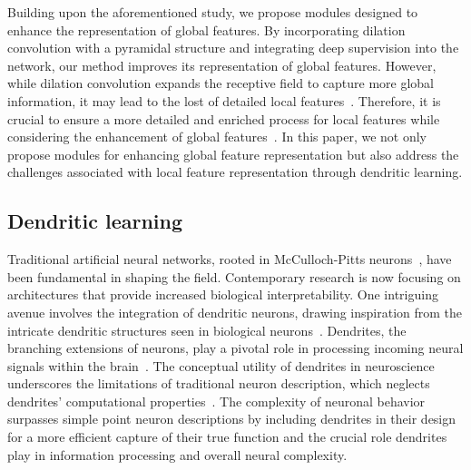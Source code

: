 \documentclass[review]{elsarticle}
\begin{document}
	Building upon the aforementioned study, we propose modules designed to enhance the representation of global features. By incorporating dilation convolution with a pyramidal structure and integrating deep supervision into the network, our method improves its representation of global features. However, while dilation convolution expands the receptive field to capture more global information, it may lead to the lost of detailed local features~\cite{hamaguchi2018effective}. Therefore, it is crucial to ensure a more detailed and enriched process for local features while considering the enhancement of global features~\cite{liu2020color}. In this paper, we not only propose modules for enhancing global feature representation but also address the challenges associated with local feature representation through dendritic learning.

	\subsection{Dendritic learning}		
	Traditional artificial neural networks, rooted in McCulloch-Pitts neurons~\cite{mcculloch1943logical}, have been fundamental in shaping the field. Contemporary research is now focusing on architectures that provide increased biological interpretability. One intriguing avenue involves the integration of dendritic neurons, drawing inspiration from the intricate dendritic structures seen in biological neurons~\cite{gao2018dendritic}. Dendrites, the branching extensions of neurons, play a pivotal role in processing incoming neural signals within the brain~\cite{richards2019deep}. The conceptual utility of dendrites in neuroscience underscores the limitations of traditional neuron description, which neglects dendrites' computational properties~\cite{LARKUM20224,tang2022adopting}. The complexity of neuronal behavior surpasses simple point neuron descriptions by including dendrites in their design for a more efficient capture of their true function and the crucial role dendrites play in information processing and overall neural complexity.
	
\end{document}
